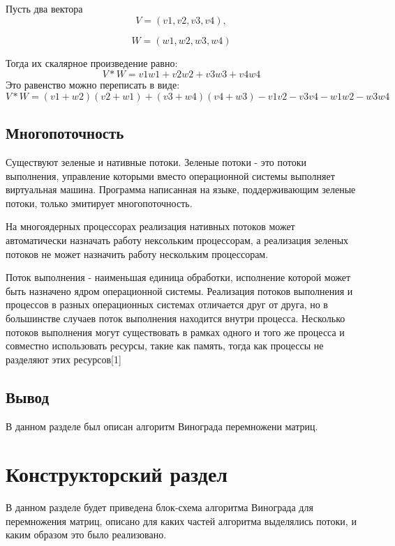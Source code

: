 \documentclass[12pt, a4paper]{report}
\begin{document}
	Пусть два вектора $$V = (v1, v2, v3, v4), $$
	 
	$$W = (w1, w2, w3, w4)$$
	
	Тогда их скалярное произведение равно: 
	$$V * W = v1w1 + v2w2 + v3w3 + v4w4$$
	Это равенство можно переписать в виде: 
	$$V * W = (v1 + w2)(v2 + w1) + (v3 + w4)(v4 + w3) - 
	v1v2 - v3v4 - w1w2 - w3w4$$
	

	\section{Многопоточность}
	
	\hspace{0.6cm}Существуют зеленые и нативные потоки. Зеленые потоки - это потоки выполнения, управление которыми вместо операционной системы выполняет виртуальная машина. Программа написанная на языке, поддерживающим зеленые потоки, только эмитирует многопоточность. 
	
	\vspace{0.3cm}На многоядерных процессорах реализация нативных потоков может автоматически назначать работу нексольким процессорам, а реализация зеленых потоков не может назначить работу нескольким процессорам.
	
	\vspace{0.3cm}Поток выполнения - наименьшая единица обработки, исполнение которой может быть назначено ядром операционной системы. Реализация потоков выполнения и процессов в разных операционных системах отличается друг от друга, но в большинстве случаев поток выполнения находится внутри процесса. Несколько потоков выполнения могут существовать в рамках одного и того же процесса и совместно использовать ресурсы, такие как память, тогда как процессы не разделяют этих ресурсов[1]
	
	\section{Вывод}
	
	В данном разделе был описан алгоритм Винограда перемножени матриц.
	

	\chapter{Конструкторский раздел}
	
	\vspace{-0.6cm}\hspace{0.6cm} В данном разделе будет приведена блок-схема алгоритма Винограда для перемножения матриц, описано для каких частей алгоритма выделялись потоки, и каким образом это было реализовано.
	
\end{document}
